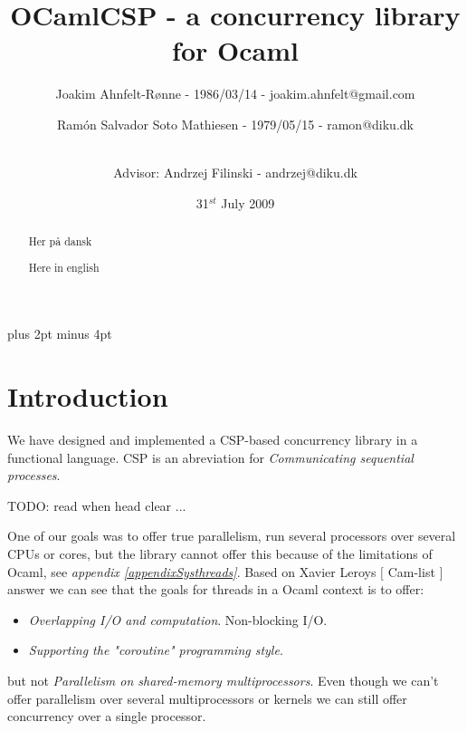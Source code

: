 \documentclass[a4paper,12pt]{article}
\title{OCamlCSP - a concurrency library for Ocaml}
\author{Joakim Ahnfelt-Rønne - 1986/03/14 - joakim.ahnfelt@gmail.com \and 
        Ramón Salvador Soto Mathiesen - 1979/05/15 - ramon@diku.dk \and
        \\ Advisor: Andrzej Filinski - andrzej@diku.dk}
\date{31$^{st}$ July 2009}
\begin{document}
\maketitle

\newpage
{}
\begin{abstract}

Her på dansk
\end{abstract}

\newpage
{}
\begin{abstract}
Here in english
\end{abstract}

\newpage
\tableofcontents
\newpage

\parindent=0pt
\parskip=8pt plus 2pt minus 4pt

\section{Introduction}
We have designed and implemented a CSP-based concurrency library in a functional
language\cite{ocaml}. CSP is an abreviation for {\it Communicating sequential
processes}\cite{hoare}.

TODO: read when head clear ...


One of our goals was to offer true parallelism, run several processors
over several CPUs or cores, but the library cannot offer this because of the
limitations of Ocaml, see {\it appendix \ref{appendixSysthreads}}. Based on
Xavier Leroys $[$ Cam-list $]$ answer we can see that the goals for threads in a
Ocaml context is to offer:
\begin{itemize}
 \item {\it Overlapping I/O and computation}. Non-blocking I/O.
 \item {\it Supporting the "coroutine" programming style}.
\end{itemize}
but not {\it Parallelism on shared-memory multiprocessors}. Even though we can't
offer parallelism over several multiprocessors or kernels we can still offer
concurrency over a single processor.
\end{document}
